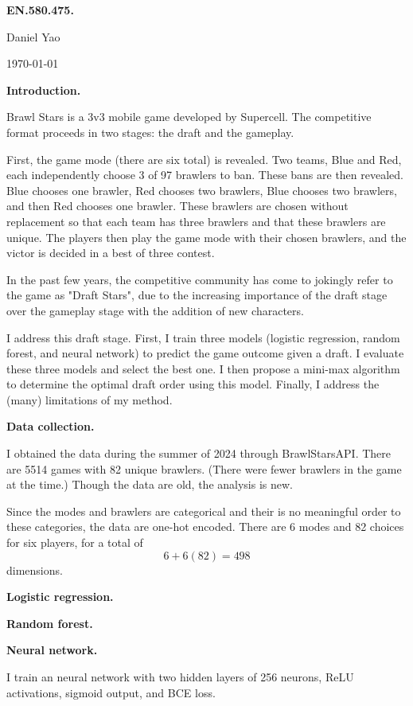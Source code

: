 \documentclass[12pt]{article}
\begin{document}
\textbf{EN.580.475.}

Daniel Yao

\today

\textbf{Introduction.}

Brawl Stars is a 3v3 mobile game developed by Supercell. The competitive format proceeds in two stages: the draft and the gameplay.

First, the game mode (there are six total) is revealed. Two teams, Blue and Red, each independently choose 3 of 97 brawlers to ban. These bans are then revealed. Blue chooses one brawler, Red chooses two brawlers, Blue chooses two brawlers, and then Red chooses one brawler. These brawlers are chosen without replacement so that each team has three brawlers and that these brawlers are unique. The players then play the game mode with their chosen brawlers, and the victor is decided in a best of three contest.

In the past few years, the competitive community has come to jokingly refer to the game as "Draft Stars", due to the increasing importance of the draft stage over the gameplay stage with the addition of new characters.

I address this draft stage. First, I train three models (logistic regression, random forest, and neural network) to predict the game outcome given a draft. I evaluate these three models and select the best one. I then propose a mini-max algorithm to determine the optimal draft order using this model. Finally, I address the (many) limitations of my method.

\textbf{Data collection.}

I obtained the data during the summer of 2024 through BrawlStarsAPI. There are 5514 games with 82 unique brawlers. (There were fewer brawlers in the game at the time.) Though the data are old, the analysis is new.

Since the modes and brawlers are categorical and their is no meaningful order to these categories, the data are one-hot encoded. There are 6 modes and 82 choices for six players, for a total of 
$$6 + 6(82) = 498$$
dimensions.

\textbf{Logistic regression.}

\textbf{Random forest.}

\textbf{Neural network.}

I train an neural network with two hidden layers of 256 neurons, ReLU activations, sigmoid output, and BCE loss.
\end{document}
